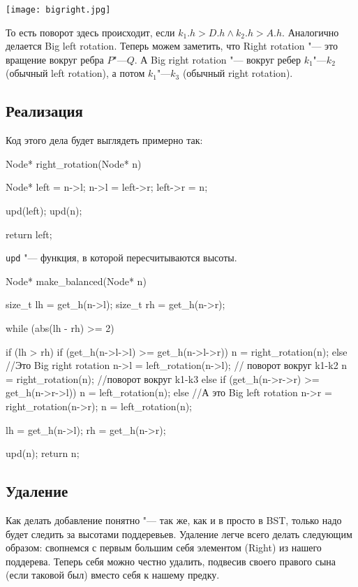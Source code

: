 \begin{center} \texttt{[image: bigright.jpg]} \end{center}

То есть поворот здесь происходит, если $k_1.h > D.h \land k_2.h > A.h$.
Аналогично делается Big left rotation.
Теперь можем заметить, что Right rotation "--- это вращение вокруг ребра $P$"---$Q$.
А Big right rotation "--- вокруг ребер $k_1$"---$k_2$ (обычный left rotation), а потом $k_1$"---$k_3$ (обычный right rotation).

\subsection{Реализация}

Код этого дела будет выглядеть примерно так:
\begin{cppcode}
Node* right_rotation(Node* n) {
	Node* left = n->l;
	n->l = left->r;
	left->r = n;

	upd(left); upd(n);

	return left;
}
\end{cppcode}
\texttt{upd} "--- функция, в которой пересчитываются высоты.

\begin{cppcode}
Node* make_balanced(Node* n) {
	size_t lh = get_h(n->l);
	size_t rh = get_h(n->r);

	while (abs(lh - rh) >= 2) {
		if (lh > rh) {
			if (get_h(n->l->l) >= get_h(n->l->r)) {
				n = right_rotation(n);
			} else { //Это Big right rotation
				n->l = left_rotation(n->l); // поворот вокруг k1-k2
				n = right_rotation(n); //поворот вокруг k1-k3
			}
		} else {
			if (get_h(n->r->r) >= get_h(n->r->l)) {
				n = left_rotation(n);
			} else { //А это Big left rotation
				n->r = right_rotation(n->r);
				n = left_rotation(n);
			}
		}

		lh = get_h(n->l);
		rh = get_h(n->r);
	}

	upd(n);
	return n;
}
\end{cppcode}

\subsection{Удаление}

Как делать добавление понятно "--- так же, как и в просто в BST, только надо будет следить за высотами поддеревьев.
Удаление легче всего делать следующим образом: свопнемся с первым большим себя элементом (Right) из нашего поддерева.
Теперь себя можно честно удалить, подвесив своего правого сына (если таковой был) вместо себя к нашему предку.

